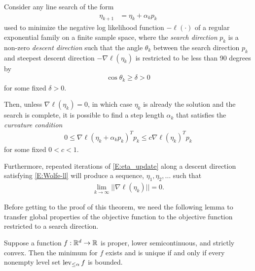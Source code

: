 \begin{theorem} \label{Thm:log like 
max}
Consider any line search of the form 
\begin{align}
	\eta_{k+1} &= \eta_k + \alpha_k p_k \label{E:eta_update}
\end{align}
used to minimize the negative log likelihood function $-\ell(\cdot)$ of a regular 
exponential family on a finite sample space, where the \emph{search direction} $p_k$ 
is a non-zero \emph{descent direction}
such that the angle $\theta_k$ between the search direction $p_k$ and steepest descent 
direction $-\nabla \ell(\eta_k)$ is 
restricted to be less than 90 degrees by
\begin{align*}
\cos \theta_k \geq \delta > 0
\end{align*}
 for some fixed $\delta > 0$.  

Then, unless $\nabla \ell(\eta_k) = 0$, in which case $\eta_k$ is already the solution 
and the search is complete, it is 
possible to find a step length $\alpha_k$ that satisfies the \emph{curvature 
condition}
\begin{align}
	0 \leq \nabla \ell( \eta_k + \alpha_k p_k)^T p_k  \leq c \nabla \ell(\eta_k)^T p_k  
\label{E:Wolfe-ll}
\end{align}
for some fixed $0 < c < 1$.

Furthermore, repeated iterations of \eqref{E:eta_update} along a descent direction 
satisfying \eqref{E:Wolfe-ll} will produce a sequence, $\eta_1, \eta_2, \ldots$ such 
that
\begin{align*}
	\lim_{k \to \infty} || \nabla \ell(\eta_k) || = 0.
\end{align*}
\end{theorem}

Before getting to the proof of this theorem, we need the 
following lemma to transfer global properties of the objective function to the 
objective function restricted to a 
search direction.

\begin{lemma} \label{Lemma:f min} 
Suppose a function $f:{\mathbb R}^d \to {\mathbb R}$ is proper, lower semicontinuous, and strictly 
convex.  Then the minimum for $f$ 
exists and is unique if and only if every nonempty level set $\operatorname{lev}_{\leq \alpha} f$ is 
bounded.
\end{lemma}

